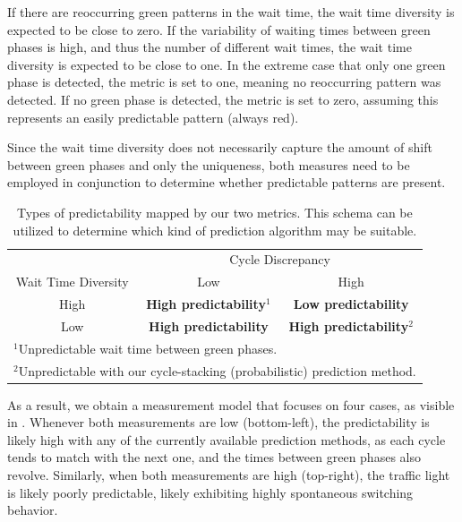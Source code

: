 If there are reoccurring green patterns in the wait time, the wait time diversity is expected to be close to zero. If the variability of waiting times between green phases is high, and thus the number of different wait times, the wait time diversity is expected to be close to one. In the extreme case that only one green phase is detected, the metric is set to one, meaning no reoccurring pattern was detected. If no green phase is detected, the metric is set to zero, assuming this represents an easily predictable pattern (always red).

Since the wait time diversity does not necessarily capture the amount of shift between green phases and only the uniqueness, both measures need to be employed in conjunction to determine whether predictable patterns are present.

\begin{table}[!b]
\centering
\def\arraystretch{1.5}
\caption{Types of predictability mapped by our two metrics. This schema can be utilized to determine which kind of prediction algorithm may be suitable.}
\label{tab:cases}
\begin{tabular}{c|c|c|}
\multicolumn{1}{c}{} & \multicolumn{2}{c}{Cycle Discrepancy} \\
\cline{2-3}
Wait Time Diversity& Low& High\\
\hline
\multicolumn{1}{|c|}{High}& \textbf{\color{good} High predictability}$^1$& \textbf{\color{bad} Low predictability} \\
\hline
\multicolumn{1}{|c|}{Low}& \textbf{\color{good} High predictability}& \textbf{\color{good} High predictability}$^2$\\
\hline
\multicolumn{3}{l}{$^1$\footnotesize{Unpredictable wait time between green phases.}} \\
\multicolumn{3}{l}{$^2$\footnotesize{Unpredictable with our cycle-stacking (probabilistic) prediction method.}}
\end{tabular}
\end{table}

As a result, we obtain a measurement model that focuses on four cases, as visible in . Whenever both measurements are low (bottom-left), the predictability is likely high with any of the currently available prediction methods, as each cycle tends to match with the next one, and the times between green phases also revolve. Similarly, when both measurements are high (top-right), the traffic light is likely poorly predictable, likely exhibiting highly spontaneous switching behavior. 

